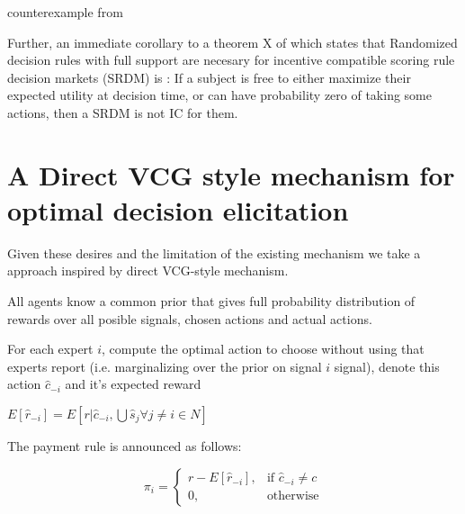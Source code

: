 \begin{eg}
	counterexample from \cite{othman2010decision}
\end{eg}


 

Further, an immediate corollary to a theorem X of \cite{chen2014eliciting} 
 which states that Randomized decision rules with full support are necesary for incentive compatible  scoring rule decision markets (SRDM) is : If a subject is free to either maximize their expected utility at decision time, or can have probability zero of taking some actions, then a SRDM is not IC for them.




\section{A Direct VCG style mechanism for optimal decision elicitation }
Given these desires and the limitation of the existing mechanism we take a approach inspired by direct VCG-style mechanism.

All agents know a common prior that gives full probability distribution of rewards over all posible signals, chosen actions and actual actions.

For each expert $i$, compute the optimal action to choose without using that experts report (i.e. marginalizing over the prior on signal $i$ signal), denote this action $\hat{c}_{-i}$ and it's expected reward 

$E[\hat{r}_{-i}] = E[ r| \hat{c}_{-i}, \bigcup \hat{s}_j  \forall j \neq i \in N]$  


 The payment rule is announced as follows:

\[
    \pi_i = 
\begin{cases}
    r - E[\hat{r}_{-i}] ,& \text{if } \hat{c}_{-i} \neq c\\
    0,              & \text{otherwise}
\end{cases}
\]


